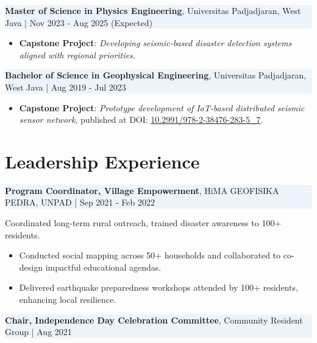 \documentclass[10.5pt,a4paper]{article}
\begin{document}
\setlength{\fboxsep}{0pt}%
\colorbox[HTML]{EDF4FB}{%
  \parbox{\linewidth}{%
    \textbf{Master of Science in Physics Engineering}, Universitas Padjadjaran, West Java \quad | \quad Nov 2023 - Aug 2025 (Expected)%
  }%
}
\begin{itemize}[left=1.5em, noitemsep, topsep=0pt]
    \item \textbf{Capstone Project}: \textit{Developing seismic-based disaster detection systems aligned with regional priorities.}
\end{itemize}

\vspace{0.5em}

\setlength{\fboxsep}{0pt}%
\colorbox[HTML]{EDF4FB}{%
  \parbox{\linewidth}{%
    \textbf{Bachelor of Science in Geophysical Engineering}, Universitas Padjadjaran, West Java \quad | \quad Aug 2019 - Jul 2023%
  }%
}
\begin{itemize}[left=1.5em, noitemsep, topsep=0pt]
  \item \textbf{Capstone Project}: \textit{Prototype development of IoT-based distributed seismic sensor network}, published at \linebreak DOI: \href{https://doi.org/10.2991/978-2-38476-283-5_7}{10.2991/978-2-38476-283-5\_7}.
\end{itemize}





\section*{Leadership Experience}
\noindent 
\setlength{\fboxsep}{0pt}%
\colorbox[HTML]{EDF4FB}{%
  \parbox{\linewidth}{%
    \textbf{Program Coordinator, Village Empowerment}, HiMA GEOFISIKA PEDRA, UNPAD \quad | \quad Sep 2021 - Feb 2022%
  }%
}

Coordinated long-term rural outreach, trained disaster awareness to 100+ residents.
\begin{itemize}[left=1.5em, noitemsep, topsep=0pt]
  \item Conducted social mapping across 50+ households and collaborated to co-design impactful educational agendas.
  \item Delivered earthquake preparedness workshops attended by 100+ residents, enhancing local resilience.
\end{itemize}

\vspace{0.5em}

\noindent 
\setlength{\fboxsep}{0pt}%
\colorbox[HTML]{EDF4FB}{%
  \parbox{\linewidth}{%
    \textbf{Chair, Independence Day Celebration Committee}, Community Resident Group \quad | \quad Aug 2021%
  }%
}
\end{document}
